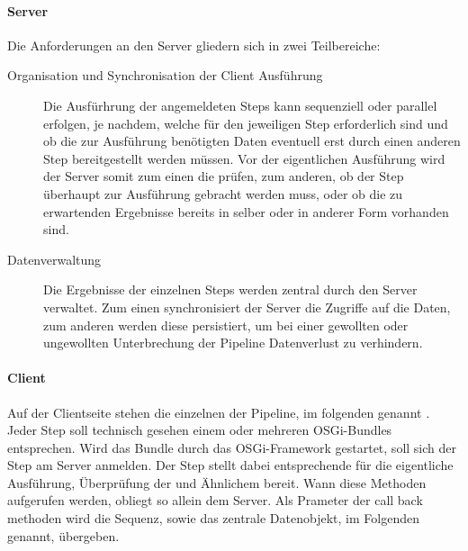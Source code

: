 \paragraph{Server}
Die Anforderungen an den Server gliedern sich in zwei Teilbereiche:
\begin{description}
\item[Organisation und Synchronisation der Client Ausführung]
Die Ausfürhrung der angemeldeten Steps kann sequenziell oder
parallel erfolgen, je nachdem, welche  für den
jeweiligen Step erforderlich sind und ob die zur Ausführung benötigten Daten
eventuell erst durch einen anderen Step bereitgestellt werden müssen.
Vor der eigentlichen Ausführung wird der Server somit zum einen die
 prüfen, zum anderen, ob der Step überhaupt zur Ausführung
gebracht werden muss, oder ob die zu erwartenden Ergebnisse bereits in selber
oder in anderer Form vorhanden sind.
\item[Datenverwaltung] Die Ergebnisse der einzelnen Steps werden zentral durch
den Server verwaltet.
Zum einen synchronisiert der Server die Zugriffe auf die Daten, zum anderen
werden diese persistiert, um bei einer gewollten oder ungewollten Unterbrechung
der Pipeline Datenverlust zu verhindern.
\end{description}

\paragraph{Client}
Auf der Clientseite stehen die einzelnen  der Pipeline, im
folgenden  genannt . Jeder Step soll technisch
gesehen einem oder mehreren OSGi-Bundles entsprechen.
Wird das Bundle durch das OSGi-Framework gestartet, soll sich der Step am Server
anmelden. Der Step stellt dabei entsprechende  für die
eigentliche Ausführung, Überprüfung der  und
Ähnlichem bereit.
Wann diese Methoden aufgerufen werden, obliegt so allein
dem Server.
Als Prameter der call back methoden wird die Sequenz, sowie das zentrale
Datenobjekt, im Folgenden   genannt,
übergeben.

